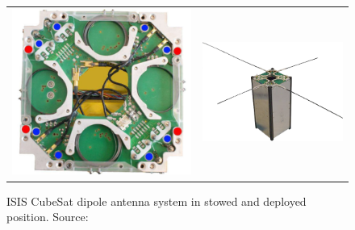 \begin{figure}
   \centering
\begin{tabular}{cc}
        \includegraphics[width=0.3\paperwidth]{img/3/isis_antenna_stowed.jpg}
    & 
        \includegraphics[width=0.45\paperwidth]{img/3/CubeSat-antenna-dipole-configuration.png}    
\end{tabular}
\label{ISIS_antenna}
\caption{ISIS CubeSat dipole antenna system in stowed and deployed position. Source: \cite{isis_dipole_antenna}}
\end{figure}



